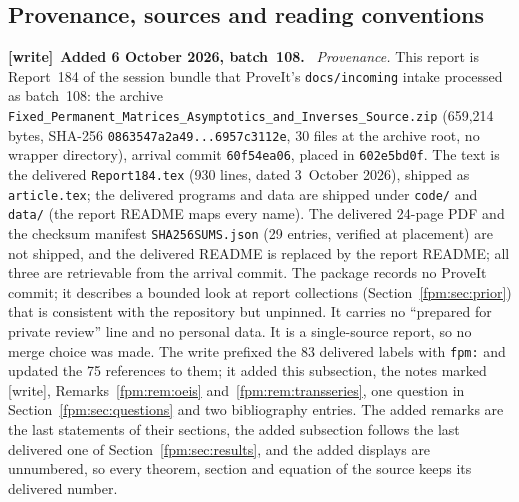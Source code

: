 \documentclass[11pt]{article}
\theoremstyle{definition}\newtheorem{definition}[theorem]{Definition}
\theoremstyle{remark}\newtheorem{remark}[theorem]{Remark}
\newcommand{\file}[1]{\nolinkurl{#1}}
\newenvironment{writenote}[1][]{\par\smallskip\begingroup\small
 \noindent\textbf{[write]}\if\relax\detokenize{#1}\relax\else~\textbf{#1.}\fi\ }%
 {\par\endgroup\smallskip}
\begin{document}
\subsection{Provenance, sources and reading conventions}\label{fpm:sec:provenance}
\begin{writenote}[Added 6 October 2026, batch~108]
\emph{Provenance.} This report is Report~184 of the session bundle that
ProveIt's \file{docs/incoming} intake processed as batch~108: the archive
\file{Fixed_Permanent_Matrices_Asymptotics_and_Inverses_Source.zip}
(659{,}214 bytes, SHA-256 \file{0863547a2a49...6957c3112e}, 30 files at the
archive root, no wrapper directory), arrival commit \file{60f54ea06}, placed
in \file{602e5bd0f}. The text is the delivered \file{Report184.tex} (930
lines, dated 3~October 2026), shipped as \file{article.tex}; the delivered
programs and data are shipped under \file{code/} and \file{data/} (the
report README maps every name). The delivered 24-page PDF and the checksum
manifest \file{SHA256SUMS.json} (29 entries, verified at placement) are not
shipped, and the delivered README is replaced by the report README; all
three are retrievable from the arrival commit. The package records no
ProveIt commit; it describes a bounded look at report collections
(Section~\ref{fpm:sec:prior}) that is consistent with the repository but
unpinned. It carries no ``prepared for private review'' line and no
personal data. It is a single-source report, so no merge choice was made.
The write prefixed the 83 delivered labels with \file{fpm:} and updated the
75 references to them; it added this subsection, the notes marked [write],
Remarks~\ref{fpm:rem:oeis} and~\ref{fpm:rem:transseries}, one question in
Section~\ref{fpm:sec:questions} and two bibliography entries. The added
remarks are the last statements of their sections, the added subsection
follows the last delivered one of Section~\ref{fpm:sec:results}, and the
added displays are unnumbered, so every theorem, section and equation of the
source keeps its delivered number.


\end{writenote}
\end{document}

